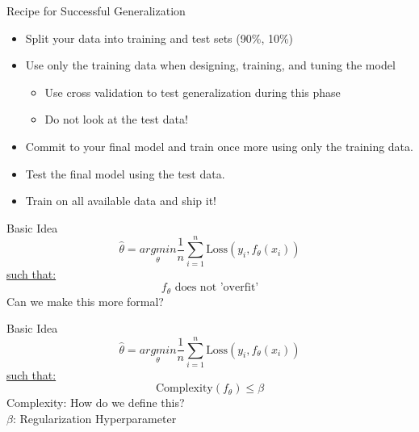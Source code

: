 \documentclass[aspectratio=169]{../latex_main/tntbeamer}  %
\begin{document}
	\begin{frame}[c]{Recipe for Successful Generalization}
	    \begin{itemize}
	        \item Split your data into training and test sets (90\%, 10\%)
	        \item Use only the training data when designing, training, and tuning the model
	        \begin{itemize}
	            \item Use cross validation to test generalization during this phase
	            \item Do not look at the test data!
	        \end{itemize}
	        \item Commit to your final model and train once more using only the training data.
	        \item Test the final model using the test data. 
	        \item Train on all available data and ship it!
	    \end{itemize}
	\end{frame}
	
	
		\begin{frame}{Basic Idea}
	    \begin{equation*}
	        \hat{\theta} = \underset{\theta}{arg min} \frac{1}{n}\sum\limits_{i=1}^n\text{Loss}(y_i,f_\theta(x_i))
	    \end{equation*}
	    \underline{such that:}
	    \begin{equation*}
	        f_\theta \text{ does not 'overfit'}
	    \end{equation*}
	    Can we make this more formal?
	\end{frame}
	
	
	\begin{frame}[c]{Basic Idea}
	    \begin{equation*}
	        \hat{\theta} = \underset{\theta}{arg min} \frac{1}{n}\sum\limits_{i=1}^n\text{Loss}(y_i,f_\theta(x_i))
	    \end{equation*}
	    \underline{such that:}
	    \begin{equation*}
	         \text{Complexity}(f_\theta) \leq \beta
	    \end{equation*}
	    Complexity: How do we define this?\\
	    $\beta$:  Regularization Hyperparameter

	\end{frame}
	
\end{document}
